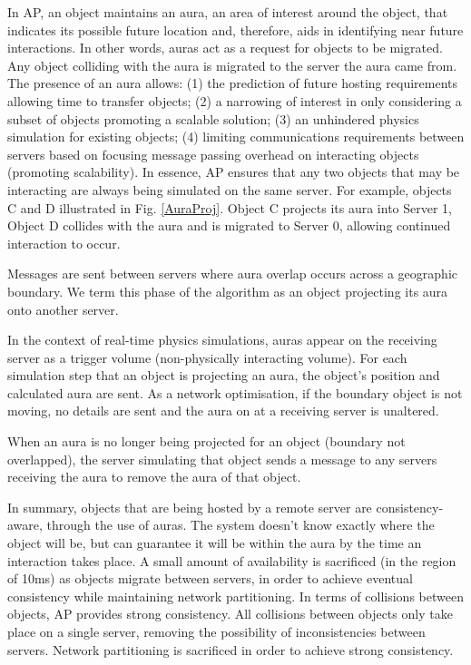In AP, an object maintains an aura, an area of interest around the object, that indicates its possible future location and, therefore, aids in identifying near future interactions. In other words, auras act as a request for objects to be migrated. Any object colliding with the aura is migrated to the server the aura came from. The presence of an aura allows: (1) the prediction of future hosting requirements allowing time to transfer objects; (2) a narrowing of interest in only considering a subset of objects promoting a scalable solution; (3) an unhindered physics simulation for existing objects; (4) limiting communications requirements between servers based on focusing message passing overhead on interacting objects (promoting scalability). In essence, AP ensures that any two objects that may be interacting are always being simulated on the same server. For example, objects C and D illustrated in Fig. \ref{AuraProj}. Object C projects its aura into Server 1, Object D collides with the aura and is migrated to Server 0, allowing continued interaction to occur.

Messages are sent between servers where aura overlap occurs across a geographic boundary. We term this phase of the algorithm as an object projecting its aura onto another server. %

In the context of real-time physics simulations, auras appear on the receiving server as a trigger volume (non-physically interacting volume). For each simulation step that an object is projecting an aura, the object's position and calculated aura are sent. As a network optimisation, if the boundary object is not moving, no details are sent and the aura on at a receiving server is unaltered.

When an aura is no longer being projected for an object (boundary not overlapped), the server simulating that object sends a message to any servers receiving the aura to remove the aura of that object.

In summary, objects that are being hosted by a remote server are consistency-aware, through the use of auras. The system doesn't know exactly where the object will be, but can guarantee it will be within the aura by the time an interaction takes place.
A small amount of availability is sacrificed (in the region of 10ms) as objects migrate between servers, in order to achieve eventual consistency while maintaining network partitioning.
In terms of collisions between objects, AP provides strong consistency. All collisions between objects only take place on a single server, removing the possibility of inconsistencies between servers. Network partitioning is sacrificed in order to achieve strong consistency.%

